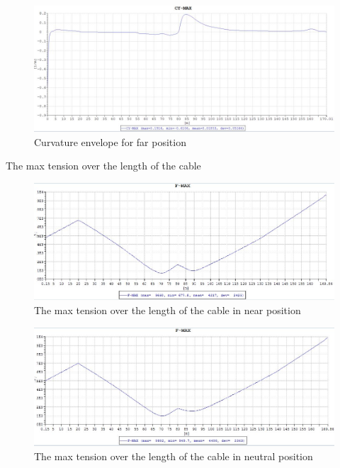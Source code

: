 \begin{figure}[H]
\centering
\includegraphics[scale=0.8]{figures/envcurvefar}
\caption{Curvature envelope for far position}
 \label{fig:envcurvefar}
\end{figure}

\noindent The max tension over the length of the cable

\begin{figure}[H]
\centering
\includegraphics[scale=0.5]{figures/fmaxnear}
\caption{The max tension over the length of the cable in near position}
 \label{fig:fmaxnear}
\end{figure}


\begin{figure}[H]
\centering
\includegraphics[scale=0.5]{figures/fmaxneu}
\caption{The max tension over the length of the cable in neutral position}
 \label{fig:fmaxneu}
\end{figure}


